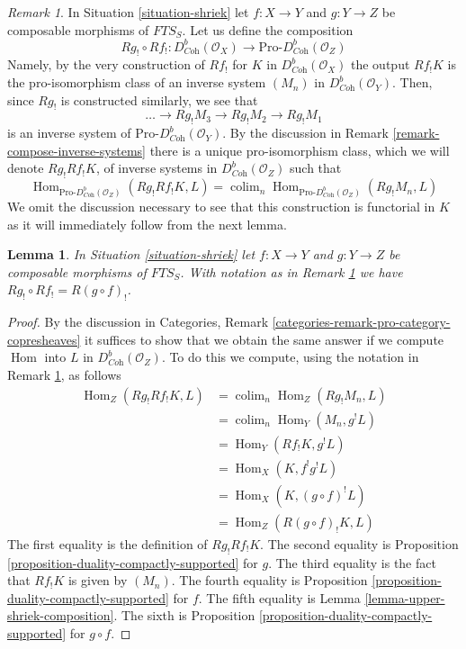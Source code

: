 \documentclass{stacks-project}
\theoremstyle{plain}
\newtheorem{lemma}[subsection]{Lemma}
\theoremstyle{definition}
\theoremstyle{remark}
\newtheorem{remark}[subsection]{Remark}
\numberwithin{equation}{subsection}
\def\colim{\mathop{\mathrm{colim}}\nolimits}
\def\Hom{\mathop{\mathrm{Hom}}\nolimits}
\begin{document}
\begin{remark}
\label{remark-composition-lower-shriek}
In Situation \ref{situation-shriek} let $f : X \to Y$ and $g : Y \to Z$
be composable morphisms of $\textit{FTS}_S$. Let us define the composition
$$
Rg_! \circ Rf_! :
D^b_{\textit{Coh}}(\mathcal{O}_X)
\longrightarrow
\text{Pro-}D^b_{\textit{Coh}}(\mathcal{O}_Z)
$$
Namely, by the very construction of $Rf_!$
for $K$ in $D^b_{\textit{Coh}}(\mathcal{O}_X)$
the output $Rf_!K$ is the pro-isomorphism class
of an inverse system $(M_n)$ in $D^b_{\textit{Coh}}(\mathcal{O}_Y)$.
Then, since $Rg_!$ is constructed similarly, we see that
$$
\ldots \to Rg_!M_3 \to Rg_!M_2 \to Rg_!M_1
$$
is an inverse system of $\text{Pro-}D^b_{\textit{Coh}}(\mathcal{O}_Y)$.
By the discussion in Remark \ref{remark-compose-inverse-systems}
there is a unique pro-isomorphism class, which we will denote
$Rg_! Rf_! K$, of inverse systems in $D^b_{\textit{Coh}}(\mathcal{O}_Z)$
such that
$$
\Hom_{\text{Pro-}D^b_{\textit{Coh}}(\mathcal{O}_Z)}(Rg_!Rf_!K, L) =
\colim_n \Hom_{\text{Pro-}D^b_{\textit{Coh}}(\mathcal{O}_Z)}(Rg_!M_n, L)
$$
We omit the discussion necessary to see that this construction
is functorial in $K$ as it will immediately follow from the next lemma.
\end{remark}

\begin{lemma}
\label{lemma-composition-lower-shriek}
In Situation \ref{situation-shriek} let $f : X \to Y$ and $g : Y \to Z$
be composable morphisms of $\textit{FTS}_S$. With notation as in
Remark \ref{remark-composition-lower-shriek} we have
$Rg_! \circ Rf_! = R(g \circ f)_!$.
\end{lemma}

\begin{proof}
By the discussion in
Categories, Remark \ref{categories-remark-pro-category-copresheaves}
it suffices to show that we obtain the same answer if we compute
$\Hom$ into $L$ in $D^b_{\textit{Coh}}(\mathcal{O}_Z)$. To do this
we compute, using the notation in
Remark \ref{remark-composition-lower-shriek}, as follows
\begin{align*}
\Hom_Z(Rg_!Rf_!K, L)
& =
\colim_n \Hom_Z(Rg_!M_n, L) \\
& =
\colim_n \Hom_Y(M_n, g^!L) \\
& =
\Hom_Y(Rf_!K, g^!L) \\
& =
\Hom_X(K, f^!g^!L) \\
& =
\Hom_X(K, (g \circ f)^!L) \\
& =
\Hom_Z(R(g \circ f)_!K, L)
\end{align*}
The first equality is the definition of $Rg_!Rf_!K$. The second
equality is Proposition \ref{proposition-duality-compactly-supported}
for $g$.
The third equality is the fact that $Rf_!K$ is given by $(M_n)$.
The fourth equality is
Proposition \ref{proposition-duality-compactly-supported} for $f$.
The fifth equality is Lemma \ref{lemma-upper-shriek-composition}.
The sixth is 
Proposition \ref{proposition-duality-compactly-supported} for $g \circ f$.
\end{proof}
\end{document}
